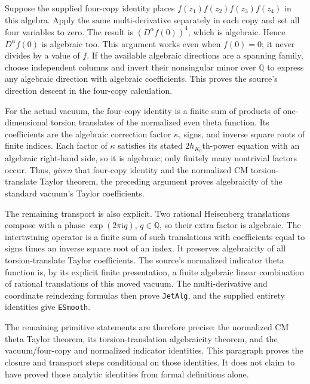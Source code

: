 Suppose the supplied four-copy identity places
$f(z_1)f(z_2)f(z_3)f(z_4)$ in this algebra. Apply the same
multi-derivative separately in each copy and set all four
variables to zero. The result is $(D^\alpha f(0))^4$, which is
algebraic. Hence $D^\alpha f(0)$ is algebraic too. This argument
works even when $f(0)=0$; it never divides by a value of $f$.
If the available algebraic directions are a spanning family,
choose independent columns and invert their nonsingular minor
over $\overline{\mathbb Q}$ to express any algebraic direction
with algebraic coefficients. This proves the source's direction
descent in the four-copy calculation.

For the actual vacuum, the four-copy identity is a finite sum
of products of one-dimensional torsion translates of the
normalized even theta function. Its coefficients are the
algebraic correction factor $\kappa$, signs, and inverse square
roots of finite indices. Each factor of $\kappa$ satisfies its
stated $2h_{K_0}$th-power equation with an algebraic right-hand
side, so it is algebraic; only finitely many nontrivial factors
occur. Thus, \emph{given} that four-copy identity and the
normalized CM torsion-translate Taylor theorem, the preceding
argument proves algebraicity of the standard vacuum's Taylor
coefficients.

The remaining transport is also explicit. Two rational
Heisenberg translations compose with a phase
$\exp(2\pi\mathrm i q)$, $q\in\mathbb Q$, so their extra factor
is algebraic. The intertwining operator is a finite sum of such
translations with coefficients equal to signs times an inverse
square root of an index. It preserves algebraicity of all
torsion-translate Taylor coefficients. The source's normalized
indicator theta function is, by its explicit finite presentation,
a finite algebraic linear combination of rational translations
of this moved vacuum. The multi-derivative and coordinate
reindexing formulas then prove \texttt{JetAlg}, and the supplied
entirety identities give \texttt{ESmooth}.

The remaining primitive statements are therefore precise: the
normalized CM theta Taylor theorem, its torsion-translation
algebraicity theorem, and the vacuum/four-copy and normalized
indicator identities. This paragraph proves the closure and
transport steps conditional on those identities. It does not
claim to have proved those analytic identities from formal
definitions alone.

